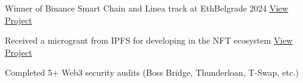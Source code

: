 \documentclass[letter,10pt]{article}
\begin{document}
\begin{zitemize}
    \item Winner of Binance Smart Chain and Linea track at EthBelgrade 2024 \hfill \href{https://t.co/V28cLMQW9K}{View Project}
    \item Received a microgrant from IPFS for developing in the NFT ecosystem \hfill \href{https://github.com/ipfs/devgrants/issues/272}{View Project}
    \item Completed 5+ Web3 security audits (Boss Bridge, Thunderloan, T-Swap, etc.)
\end{zitemize}
\end{document}
